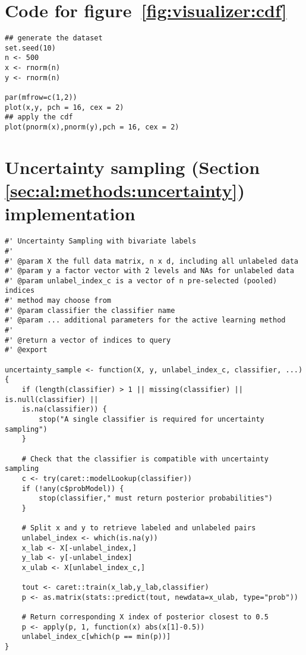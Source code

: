 \section{Code for figure~\ref{fig:visualizer:cdf}}
\label{sec:appendicies:cdf}
{
\begin{lstlisting}
## generate the dataset
set.seed(10)
n <- 500
x <- rnorm(n)
y <- rnorm(n)

par(mfrow=c(1,2))
plot(x,y, pch = 16, cex = 2)
## apply the cdf
plot(pnorm(x),pnorm(y),pch = 16, cex = 2)
\end{lstlisting}
}

\section{Uncertainty sampling (Section \ref{sec:al:methods:uncertainty}) 
implementation}
\label{sec:appendicies:al:uncertainty}
{
\begin{lstlisting}
#' Uncertainty Sampling with bivariate labels
#'
#' @param X the full data matrix, n x d, including all unlabeled data
#' @param y a factor vector with 2 levels and NAs for unlabeled data
#' @param unlabel_index_c is a vector of n pre-selected (pooled) indices
#' method may choose from 
#' @param classifier the classifier name
#' @param ... additional parameters for the active learning method
#'
#' @return a vector of indices to query
#' @export

uncertainty_sample <- function(X, y, unlabel_index_c, classifier, ...){
	if (length(classifier) > 1 || missing(classifier) || is.null(classifier) || 
	is.na(classifier)) {
		stop("A single classifier is required for uncertainty sampling")
	}
	
	# Check that the classifier is compatible with uncertainty sampling
	c <- try(caret::modelLookup(classifier))
	if (!any(c$probModel)) {
		stop(classifier," must return posterior probabilities")
	}
	
	# Split x and y to retrieve labeled and unlabeled pairs
	unlabel_index <- which(is.na(y))
	x_lab <- X[-unlabel_index,]
	y_lab <- y[-unlabel_index]
	x_ulab <- X[unlabel_index_c,]
	
	tout <- caret::train(x_lab,y_lab,classifier)
	p <- as.matrix(stats::predict(tout, newdata=x_ulab, type="prob"))
	
	# Return corresponding X index of posterior closest to 0.5
	p <- apply(p, 1, function(x) abs(x[1]-0.5))
	unlabel_index_c[which(p == min(p))]
}
\end{lstlisting}
}

